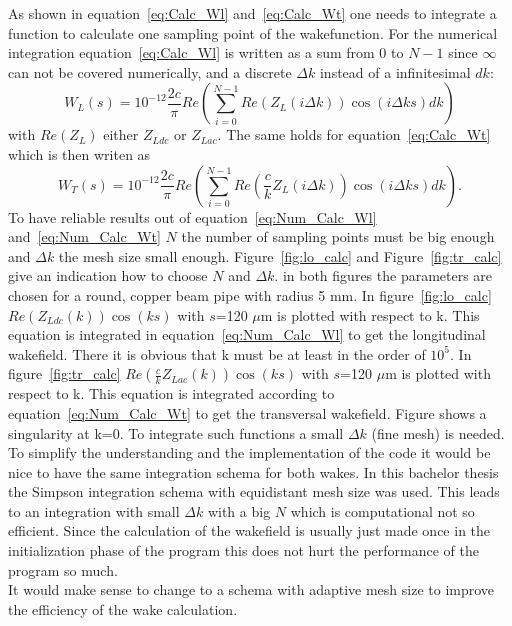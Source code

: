 \documentclass[11pt,a4paper]{article}
\begin{document}
As shown in equation~\eqref{eq:Calc_Wl} and~\eqref{eq:Calc_Wt} one needs to integrate a function to calculate one sampling point of the wakefunction.
  For the numerical integration equation~\eqref{eq:Calc_Wl} is written as a sum from 0 to $N-1$ since $\infty$ can not be covered numerically, and a discrete $\Delta k$ instead of a infinitesimal $dk$:
\begin{equation}\label{eq:Num_Calc_Wl}
W_{L}(s)=10^{-12} \dfrac{2c}{\pi}Re\left(\sum_{i=0}^{N-1} Re(Z_{L}(i \Delta k))\cos (i\Delta ks)dk\right)
\end{equation}
with $Re(Z_{L})$ either $Z_{Ldc}$ or $Z_{Lac}$.
The same holds for equation~\eqref{eq:Calc_Wt} which is then writen as
\begin{equation}\label{eq:Num_Calc_Wt}
W_{T}(s)=10^{-12} \dfrac{2c}{\pi}Re\left(\sum_{i=0}^{N-1} Re(\frac{c}{k} Z_{L}(i \Delta k))\cos (i\Delta ks)dk\right).
\end{equation}
To have reliable results out of equation~\eqref{eq:Num_Calc_Wl} and~\eqref{eq:Num_Calc_Wt} $N$ the number of sampling points must be big enough and $\Delta k$ the mesh size small enough.
Figure~\eqref{fig:lo_calc} and Figure~\eqref{fig:tr_calc} give an indication how to choose $N$ and $\Delta k$. in both figures the parameters are chosen for a round, copper beam pipe with radius 5 mm. In figure~\eqref{fig:lo_calc}  $Re(Z_{Ldc}(k))\cos (ks)$ with $s$=120 $\mu$m is plotted with respect to k. This equation is integrated in equation~\eqref{eq:Num_Calc_Wl} to get the longitudinal wakefield. There it is obvious that k must be at least in the order of $10^5$. In figure~\eqref{fig:tr_calc} $Re(\frac{c}{k}Z_{Lac}(k))\cos (ks)$ with $s$=120 $\mu$m is plotted with respect to k. This equation is integrated according to equation~\eqref{eq:Num_Calc_Wt} to get the transversal wakefield. Figure shows a singularity at k=0. To integrate such functions a small $\Delta k$ (fine mesh) is needed. To simplify the understanding and the implementation of the code it would be nice to have the same integration schema for both wakes. In this bachelor thesis the Simpson integration schema with equidistant mesh size was used. This leads to an integration with small  $\Delta k$ with a big $N$ which is computational not so efficient. Since the calculation of the wakefield is usually just made once in the initialization phase of the program this does not hurt the performance of the program so much. \\
It would make sense to change to a schema with adaptive mesh size to improve the efficiency of the wake calculation.
\end{document}
